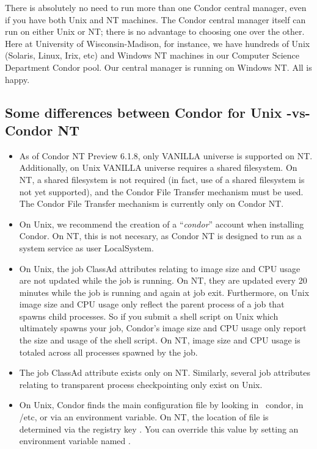 There is absolutely no need to run more than one Condor central manager, even if
you have both Unix and NT machines.  The Condor central manager itself can run on
either Unix or NT; there is no advantage to choosing one over the other.
Here at University of Wisconsin-Madison, for instance, we have hundreds of
Unix (Solaris, Linux, Irix, etc) and Windows NT machines in our Computer Science Department Condor pool.  Our
central manager is running on Windows NT.  All is happy.

\subsection{Some differences between Condor for Unix -vs- Condor NT}

\begin{itemize}

\item As of Condor NT Preview 6.1.8, only VANILLA universe is
supported on NT.  Additionally, on Unix VANILLA universe requires a shared
filesystem.  On NT, a shared filesystem is not required (in fact, use of a
shared filesystem is not yet supported), and the Condor File Transfer
mechanism must be used. \Note The Condor File Transfer mechanism is
currently only on Condor NT.

\item On Unix, we recommend the creation of a ``\textit{condor}'' account
when installing Condor.  On NT, this is not necesary, as Condor NT is
designed to run as a system service as user LocalSystem.

\item On Unix, the job ClassAd attributes relating to image size and CPU
usage are not updated while the job is running.  On NT, they are updated
every 20 minutes while the job is running and again at job exit.  Furthermore, on Unix image size and CPU usage only 
reflect the parent process of a job that spawns child processes.  So if you
submit a shell script on Unix which ultimately spawns your job, Condor's
image size and CPU usage only report the size and usage of the shell script.
On NT, image size and CPU usage is totaled across all processes spawned by
the job.

\item The job ClassAd attribute  exists only on NT.
Similarly, several job attributes relating to transparent process
checkpointing only exist on Unix.

\item On Unix, Condor finds the  main configuration file by
looking in ~condor, in /etc, or via an environment variable.  On NT, the
location of  file is determined via the registry key
.  You can override this value by
setting an environment variable named .


\end{itemize}
